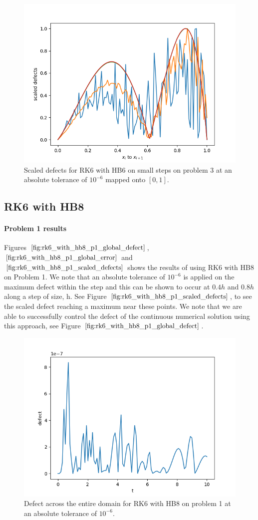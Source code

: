 \begin{figure}[H]
\centering
\includegraphics[width=0.7\linewidth]{./figures/rk6_with_hb6_p3_scaled_defects_small_steps}
\caption{Scaled defects for RK6 with HB6 on small steps on problem 3 at an absolute tolerance of $10^{-6}$ mapped onto $[0, 1]$.}
\label{fig:rk6_with_hb6_p3_scaled_defects_small_steps}
\end{figure}

\subsection{RK6 with HB8}
\paragraph{Problem 1 results}
Figures $\ref{fig:rk6_with_hb8_p1_global_defect}$, $\ref{fig:rk6_with_hb8_p1_global_error}$ and $\ref{fig:rk6_with_hb8_p1_scaled_defects}$ shows the results of using RK6 with HB8 on Problem 1. We note that an absolute tolerance of $10^{-6}$ is applied on the maximum defect within the step and this can be shown to occur at $0.4h$ and $0.8h$ along a step of size, h. See Figure $\ref{fig:rk6_with_hb8_p1_scaled_defects}$, to see the scaled defect reaching a maximum near these points. We note that we are able to successfully control the defect of the continuous numerical solution using this approach, see Figure $\ref{fig:rk6_with_hb8_p1_global_defect}$. 


\begin{figure}[H]
\centering
\includegraphics[width=0.7\linewidth]{./figures/rk6_with_hb8_p1_global_defect}
\caption{Defect across the entire domain for RK6 with HB8 on problem 1 at an absolute tolerance of $10^{-6}$.}
\label{fig:rk6_with_hb8_p1_global_defect}
\end{figure}

